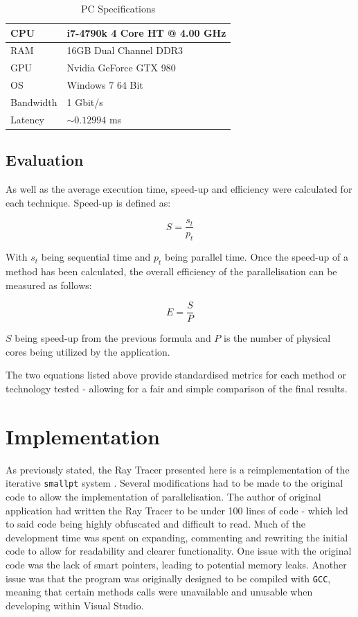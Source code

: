 \documentclass[journal,transmag]{IEEEtran}
\begin{document}
		\begin{table}[]
		\centering
		\caption{PC Specifications}
		\label{pcSpecsTable}
			\begin{tabular}{|l|l|}
				\hline
				CPU & i7-4790k 4 Core HT @ 4.00 GHz \\ \hline
				RAM & 16GB Dual Channel DDR3        \\ \hline
				GPU & Nvidia GeForce GTX 980        \\ \hline
				OS  & Windows 7 64 Bit              \\ \hline
				Bandwidth & 1 Gbit/s  				\\ \hline
				Latency   & $\sim0.12994$ ms 		\\ \hline
			\end{tabular}
		\end{table}
		
	\subsection{Evaluation}
		As well as the average execution time, speed-up and efficiency were calculated for each technique. Speed-up is defined as: 

		\[S=\frac{s_{t}}{p_{t}}\]		
		
		\noindent With \(s_{t}\) being sequential time and \(p_{t}\) being parallel time.
		Once the speed-up of a method has been calculated, the overall efficiency of the parallelisation can be measured as follows:
		
		\[E = \frac{S}{P}\]
		
		\noindent \(S\) being speed-up from the previous formula and \(P\) is the number of physical cores being utilized by the application.
		
		The two equations listed above provide standardised metrics for each method or technology tested - allowing for a fair and simple comparison of the final results.
		
\section{Implementation}
	As previously stated, the Ray Tracer presented here is a reimplementation of the iterative \texttt{smallpt} system \cite{smallptG75:online}. Several modifications had to be made to the original code to allow the implementation of parallelisation. The author of original application had written the Ray Tracer to be under 100 lines of code - which led to said code being highly obfuscated and difficult to read. Much of the development time was spent on expanding, commenting and rewriting the initial code to allow for readability and clearer functionality. One issue with the original code was the lack of smart pointers, leading to potential memory leaks. Another issue was that the program was originally designed to be compiled with \texttt{GCC}, meaning that certain methods calls were unavailable and unusable when developing within Visual Studio.
	
\end{document}

